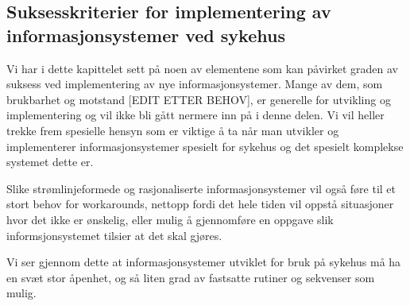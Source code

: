 \subsection{Suksesskriterier for implementering av informasjonsystemer ved sykehus}
\label{chp: suksess_sykehus}

Vi har i dette kapittelet sett på noen av elementene som kan påvirket graden av suksess ved implementering av nye informasjonsystemer. Mange av dem, som brukbarhet og motstand [EDIT ETTER BEHOV], er generelle for utvikling og implementering og vil ikke bli gått nermere inn på i denne delen. Vi vil heller trekke frem spesielle hensyn som er viktige å ta når man utvikler og implementerer informasjonsystemer spesielt for sykehus og det spesielt komplekse systemet dette er.



\noindent
Slike strømlinjeformede og rasjonaliserte informasjonsystemer vil også føre til et stort behov for workarounds, nettopp fordi det hele tiden vil oppstå situasjoner hvor det ikke er ønskelig, eller mulig å gjennomføre en oppgave slik informsjonsystemet tilsier at det skal gjøres. 

\noindent
Vi ser gjennom dette at informasjonsystemer utviklet for bruk på sykehus må ha en svæt stor åpenhet, og så liten grad av fastsatte rutiner og sekvenser som mulig.